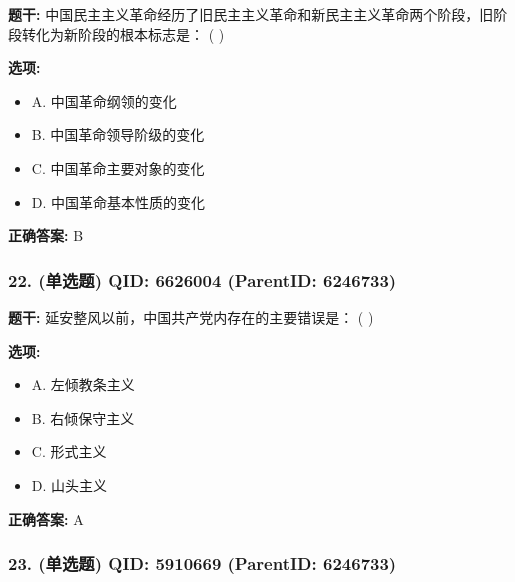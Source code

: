\documentclass[12pt,UTF8]{ctexart}
\begin{document}
\textbf{题干:}
中国民主主义革命经历了旧民主主义革命和新民主主义革命两个阶段，旧阶段转化为新阶段的根本标志是： ( )



\textbf{选项:}
\begin{itemize}[leftmargin=*]

  \item A. 中国革命纲领的变化

  \item B. 中国革命领导阶级的变化

  \item C. 中国革命主要对象的变化

  \item D. 中国革命基本性质的变化

\end{itemize}

\textbf{正确答案:}
B

\vspace{0.3em}\hrulefill\vspace{0.7em}

\subsubsection*{22. (单选题) \small QID: 6626004 (ParentID: 6246733)}

\textbf{题干:}
延安整风以前，中国共产党内存在的主要错误是： ( )



\textbf{选项:}
\begin{itemize}[leftmargin=*]

  \item A. 左倾教条主义

  \item B. 右倾保守主义

  \item C. 形式主义

  \item D. 山头主义

\end{itemize}

\textbf{正确答案:}
A

\vspace{0.3em}\hrulefill\vspace{0.7em}

\subsubsection*{23. (单选题) \small QID: 5910669 (ParentID: 6246733)}
\end{document}

